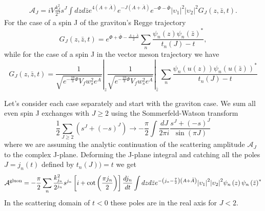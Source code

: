 \documentclass[a4paper,12pt]{article}
\begin{document}
\begin{align}
\mathcal{A}_J = i V \frac{k_J^2}{2^J} s^J \int dz d\bar{z} e^{4\left(A+\bar{A}\right)} e^{-J\left(A+\bar{A}\right)} e^{-\Phi - \bar{\Phi}} {|\upsilon_1|}^2 {|\upsilon_2|}^2  G_J \left(z, \bar{z}, t\right).
\end{align}
For the case of a spin J of the graviton's Regge trajectory
\begin{equation}
G_J \left(z, \bar{z}, t \right) = e^{\Phi + \bar{\Phi} - \frac{A+\bar{A}}{2}} \sum_n \frac{\psi_n \left(z\right) {\psi_n \left(\bar{z}\right)}^*}{t_n(J) - t},
\end{equation}
while for the case of a spin J in the vector meson trajectory we have
\begin{equation}
G_J \left(z, \bar{z}, t \right)  = \left.\frac{1}{\sqrt{e^{-\frac{10}{3}\Phi} V_f w_s^2 e^A}}\right|_z  \left.\frac{1}{\sqrt{e^{-\frac{10}{3}\Phi} V_f w_s^2 e^A}}\right|_{\bar{z}} \, \sum_n \frac{\psi_n \left(u\left(z\right)\right){\psi_n \left(u\left(\bar{z}\right)\right)}^*}{t_n(J)-t}
\end{equation}

Let's consider each case separately and start with the graviton case. We sum all even spin J exchanges with $J \geqslant 2$ using the Sommerfeld-Watson transform
\begin{equation}
\frac{1}{2} \sum_{J \geqslant 2} \left( s^J + {\left(-s\right)}^J \right) \rightarrow - \frac{\pi}{2} \int \frac{dJ}{2 \pi i} \frac{s^J + {\left(-s\right)}^J}{\sin\left(\pi J\right)}
\end{equation}
where we are assuming the analytic continuation of the scattering amplitude $\mathcal{A}_J$ to the complex J-plane. Deforming the J-plane integral and catching all the poles $J = j_n\left(t\right)$ defined by $t_n\left(J\right) ) = t$ we get
\begin{align}
\mathcal{A}^{\rm {gluon}} = - \frac{\pi}{2} \sum_n \frac{k_{j_n}^2}{2^{j_n}} s^{j_n} \left[i + \cot \left( \frac{\pi j_n}{2} \right) \right] \frac{d j_n}{dt} \int dz d\bar{z} e^{-\left(j_n - \frac{7}{2}\right) \left(A+\bar{A}\right)} {|\upsilon_1|}^2 {|\upsilon_2|}^2 \psi_n \left(z\right) {\psi_n \left(\bar{z}\right)}^*
\end{align}
In the scattering domain of $t < 0$ these poles are in the real axis for $J < 2$. 
\end{document}
